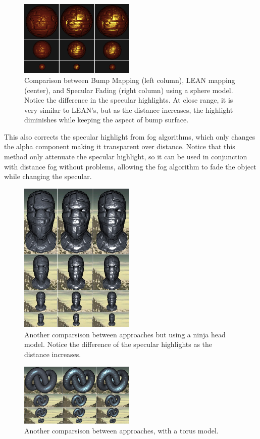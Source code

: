 \documentclass[10pt, conference]{IEEEtran}
\begin{document}
\begin{figure}[!h]
	\includegraphics[width=0.49\textwidth]{figs/BLS2.png}
	\caption{Comparison between Bump Mapping (left column), LEAN mapping (center), and Specular Fading (right column) using a sphere model. Notice the difference in the specular highlights. At close range, it is very similar to LEAN's, but as the distance increases, the highlight diminishes while keeping the aspect of bump surface.}
	\label{fig:BLS1}
\end{figure}
This also corrects the specular highlight from fog algorithms, which only changes the alpha component making it transparent over distance. Notice that this method only attenuate the specular highlight, so it can be used in conjunction with distance fog without problems, allowing the fog algorithm to fade the object while changing the specular.
\begin{figure}[h]
	\includegraphics[width=0.49\textwidth]{figs/BLS1.png}
	\caption{Another comparsison between approaches but using a ninja head model. Notice the difference of the specular highlights as the distance increases.}
	\label{fig:BLS2}
\end{figure}

\begin{figure}[h]
	\includegraphics[width=0.49\textwidth]{figs/BLS3.png}
	\caption{Another comparsison between approaches, with a torus model.}
	\label{fig:BLS3}
\end{figure}
\end{document}
